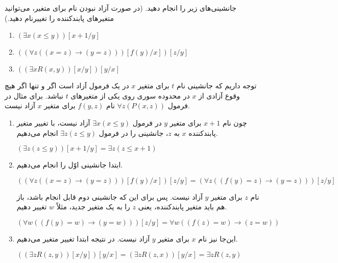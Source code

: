 
	جانشینی‌های زیر را انجام دهید. (در صورت آزاد نبودن نام برای متغیر، می‌توانید متغیرهای پابندکننده را تغییرنام دهید.)
	\begin{enumerate}[label=(\alph*)]
		\item $(\exists x (x \leq y))[x+1/y]$
		\item $((\forall z ((x = z) \rightarrow (y = z)))[f(y)/x])[z/y]$
		\item $((\exists x R(x, y))[x/y])[y/x]$
	\end{enumerate}
	\quad\vspace{0.5cm}
	\begin{ans}
		توجه داریم که جانشینی نام $t$ برای متغیر $x$ در یک فرمول آزاد است اگر و تنها اگر هیچ وقوع آزادی از $x$ در محدوده سوری روی یکی از متغیر‌های $t$ نباشد. 
		برای مثال در فرمول $\forall z(P(x, z))$ نام $f(y,z)$ برای متغیر $x$ آزاد نیست.

		\begin{enumerate}[label=(\alph*)]
			\item 
			چون نام $x + 1$ برای متغیر $y$ در فرمول $\exists x (x \le y)$ آزاد نیست، با تغییر متغیر پابندکننده $x$ به $z$، جانشینی را در فرمول $\exists z (z \leq y)$  انجام می‌دهیم.

			$(\exists z (z \leq y))[x+1/y] = \exists z (z \le x + 1)$

			\item
			ابتدا جانشینی اوّل را انجام می‌دهیم.

			$((\forall z ((x = z) \rightarrow (y = z)))[f(y)/x])[z/y] = (\forall z ((f(y) = z) \rightarrow (y = z)))[z/y]$

			نام $z$ برای متغیر $y$ آزاد نیست. پس برای این که جانشینی دوم قابل انجام باشد، باز هم باید متغیر پابندکننده، یعنی $z$ را به یک متغیر جدید، مثلاً $w$ تغییر دهیم.

			$(\forall w ((f(y) = w) \rightarrow (y = w)))[z/y] = \forall w ((f(z) = w) \rightarrow (z = w))$

			\item
			این‌جا نیز نام $x$ برای متغیر $y$ آزاد نیست. در نتیجه ابتدا تغییر متغیر می‌دهیم.

			$((\exists z R(z, y))[x/y])[y/x] = (\exists z R(z, x))[y/x] = \exists z R(z, y)$
		\end{enumerate}
	\end{ans}
